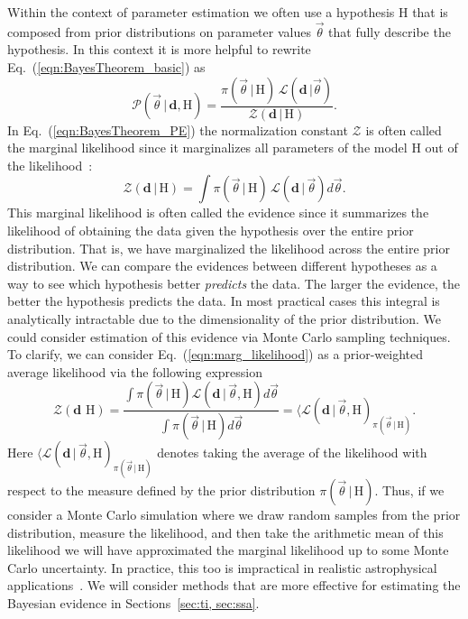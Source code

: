 Within the context of parameter estimation we often use a hypothesis H that is composed from prior distributions on parameter values $\vec{\theta}$ that fully describe the hypothesis. In this context it is more helpful to rewrite Eq.~(\ref{eqn:BayesTheorem_basic}) as
\begin{equation}\label{eqn:BayesTheorem_PE}
   \mathcal{P}(\vec{\theta} \, | \, \mathbf{d}, \mathrm{H}) = \frac{\pi(\vec{\theta} \, | \, \mathrm{H}) \, \mathcal{L}(\mathbf{d} \, | \vec{\theta})}{\mathcal{Z}(\mathbf{d} \, | \, \mathrm{H})}.
\end{equation} 
In Eq.~(\ref{eqn:BayesTheorem_PE}) the normalization constant $\mathcal{Z}$ is often called the marginal likelihood since it marginalizes all parameters of the model H out of the likelihood~\cite{hobson2010bayesian}:
\begin{equation}\label{eqn:marg_likelihood}
    \mathcal{Z}(\mathbf{d} \, | \, \mathrm{H}) = \int \pi(\vec{\theta} \, | \, \mathrm{H}) \, \mathcal{L}(\mathbf{d} \, | \, \vec{\theta}) d\vec{\theta}.
\end{equation} 
This marginal likelihood is often called the evidence since it summarizes the likelihood of obtaining the data given the hypothesis over the entire prior distribution. That is, we have marginalized the likelihood across the entire prior distribution. We can compare the evidences between different hypotheses as a way to see which hypothesis better \textit{predicts} the data. The larger the evidence, the better the hypothesis predicts the data. In most practical cases this integral is analytically intractable due to the dimensionality of the prior distribution. We could consider estimation of this evidence via Monte Carlo sampling techniques. To clarify, we can consider Eq.~(\ref{eqn:marg_likelihood}) as a prior-weighted average likelihood via the following expression
\begin{equation}
    \mathcal{Z}(\mathbf{d} \, \, \mathrm{H}) = \frac{\int \pi(\vec{\theta}\, | \, \mathrm{H}) \mathcal{L}(\mathbf{d} \, | \, \vec{\theta}, \mathrm{H}) d\vec{\theta}}
                                                    {\int \pi(\vec{\theta} \, | \, \mathrm{H}) d\vec{\theta}} = \langle \mathcal{L}(\mathbf{d} \, | \, \vec{\theta}, \mathrm{H})_{\pi(\vec{\theta} \, | \, \mathrm{H})}.
\end{equation}
Here $\langle \mathcal{L}(\mathbf{d} \, | \, \vec{\theta}, \mathrm{H})_{\pi(\vec{\theta} \, | \, \mathrm{H})}$ denotes taking the average of the likelihood with respect to the measure defined by the prior distribution $\pi(\vec{\theta} \, | \, \mathrm{H})$. Thus, if we consider a Monte Carlo simulation where  we draw random samples from the prior distribution, measure the likelihood, and then take the arithmetic mean of this likelihood we will have approximated the marginal likelihood up to some Monte Carlo uncertainty. In practice, this too is impractical in realistic astrophysical applications~\cite{wall2012practical}. We will consider methods that are more effective for estimating the Bayesian evidence in Sections~\ref{sec:ti, sec:ssa}.

